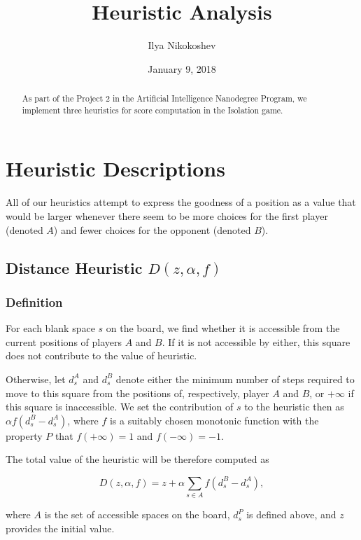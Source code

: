 \documentclass[oneside]{article}   	%
\title{Heuristic Analysis}
\author{Ilya Nikokoshev}
\date{January 9, 2018}
\begin{document}
\maketitle

\begin{abstract}
As part of the Project 2 in the Artificial Intelligence Nanodegree Program, we implement three heuristics for score computation in the Isolation game.
\end{abstract}

\tableofcontents

\section{Heuristic Descriptions}

All of our heuristics attempt to express the goodness of a position as a value that would be larger whenever there seem to be more choices for the first player (denoted $A$) and fewer choices for the opponent (denoted $B$).


\subsection{Distance Heuristic $D(z, \alpha, f)$}

\subsubsection{Definition}

For each blank space $s$ on the board, we find whether it is accessible from the current positions of players $A$ and $B$. If it is not accessible by either, this square does not contribute to the value of heuristic. 

Otherwise, let $d^A_s$ and $d^B_s$ denote either the minimum number of steps required to move to this square from the positions of, respectively, player $A$ and $B$, or $+\infty$ if this square is inaccessible. We set the contribution of $s$ to the heuristic then as $\alpha f(d^B_s-d^A_s)$,
where $f$ is a suitably chosen monotonic function with the property $P$ that $f(+\infty) = 1$ and $f(-\infty) = -1$. 

The total value of the heuristic will be therefore computed as 

$$D(z, \alpha, f) = z + \alpha\sum_{s\in A}f(d^B_s-d^A_s), $$

where $A$ is the set of accessible spaces on the board, $d^P_s$ is defined above, and $z$ provides the initial value. 
\end{document}
